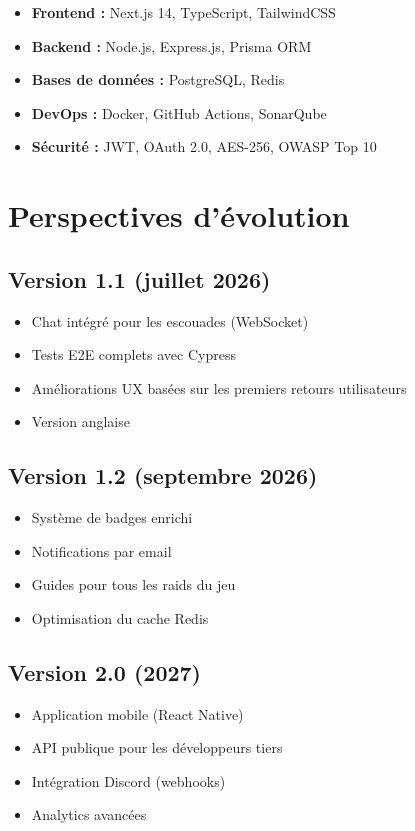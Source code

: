 \begin{itemize}
    \item \textbf{Frontend :} Next.js 14, TypeScript, TailwindCSS
    \item \textbf{Backend :} Node.js, Express.js, Prisma ORM
    \item \textbf{Bases de données :} PostgreSQL, Redis
    \item \textbf{DevOps :} Docker, GitHub Actions, SonarQube
    \item \textbf{Sécurité :} JWT, OAuth 2.0, AES-256, OWASP Top 10
\end{itemize}

\section{Perspectives d'évolution}

\subsection*{Version 1.1 (juillet 2026)}
\begin{itemize}
    \item Chat intégré pour les escouades (WebSocket)
    \item Tests E2E complets avec Cypress
    \item Améliorations UX basées sur les premiers retours utilisateurs
    \item Version anglaise
\end{itemize}

\subsection*{Version 1.2 (septembre 2026)}
\begin{itemize}
    \item Système de badges enrichi
    \item Notifications par email
    \item Guides pour tous les raids du jeu
    \item Optimisation du cache Redis
\end{itemize}

\subsection*{Version 2.0 (2027)}
\begin{itemize}
    \item Application mobile (React Native)
    \item API publique pour les développeurs tiers
    \item Intégration Discord (webhooks)
    \item Analytics avancées
\end{itemize}

